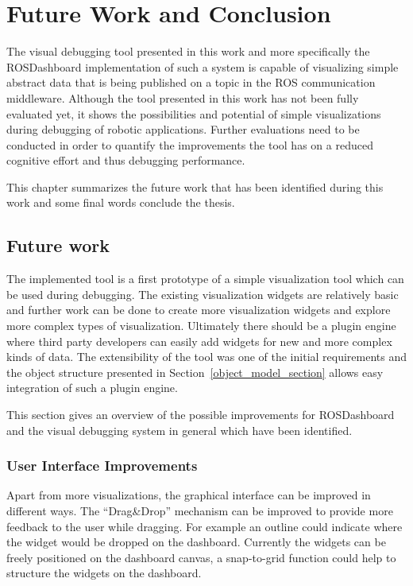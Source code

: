 \chapter{Future Work and Conclusion}
\label{future_work}

The visual debugging tool presented in this work and more specifically the ROSDashboard implementation of such a system is capable of visualizing simple abstract data that is being published on a topic in the ROS communication middleware. Although the tool presented in this work has not been fully evaluated yet, it shows the possibilities and potential of simple visualizations during debugging of robotic applications. Further evaluations need to be conducted in order to quantify the improvements the tool has on a reduced cognitive effort and thus debugging performance.

This chapter summarizes the future work that has been identified during this work and some final words conclude the thesis.


\section{Future work}
The implemented tool is a first prototype of a simple visualization tool which can be used during debugging. The existing visualization widgets are relatively basic and further work can be done to create more visualization widgets and explore more complex types of visualization. Ultimately there should be a plugin engine where third party developers can easily add widgets for new and more complex kinds of data. The extensibility of the tool was one of the initial requirements and the object structure presented in Section~\ref{object_model_section} allows easy integration of such a plugin engine.

This section gives an overview of the possible improvements for ROSDashboard and the visual debugging system in general which have been identified.

\subsection{User Interface Improvements}
Apart from more visualizations, the graphical interface can be improved in different ways. The ``Drag\&Drop'' mechanism can be improved to provide more feedback to the user while dragging. For example an outline could indicate where the widget would be dropped on the dashboard. Currently the widgets can be freely positioned on the dashboard canvas, a snap-to-grid function could help to structure the widgets on the dashboard.

